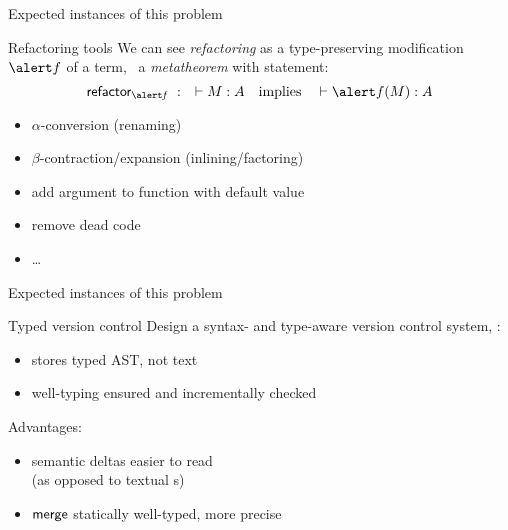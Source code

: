 \documentclass{beamer}
\theoremstyle{example}
\begin{document}
\begin{frame}{Expected instances of this problem}
  \begin{block}{Refactoring tools}
    We can see \emph{refactoring} as a type-preserving modification
    $\alert f$ of a term, \ie\ a \emph{metatheorem} with statement:
    $$ \funname{refactor_{\mathit{\alert f}}}\ :\quad \vdash M : A \quad\text{implies}\quad \vdash \alert f(M) : A $$
  \end{block}
  \begin{examples}
    \begin{itemize}
    \item $\alpha$-conversion (renaming)
    \item $\beta$-contraction/expansion (inlining/factoring)
    \item add argument to function with default value
    \item remove dead code
    \item \ldots
    \end{itemize}
  \end{examples}
\end{frame}

\begin{frame}{Expected instances of this problem}
  \begin{block}{Typed version control}
    Design a syntax- and type-aware version control system, \ie:

    \begin{itemize}
    \item stores typed AST, not text
    \item well-typing ensured and incrementally checked
    \end{itemize}

    Advantages:
    \begin{itemize}
    \item semantic deltas easier to read\\
      {\small (as opposed to textual s)}
    \item ${\rm\mathsf{merge}}$ statically well-typed, more precise
    \end{itemize}
  \end{block}
\end{frame}

\setcounter{framenumber}{\value{finalframe}}
\end{document}
